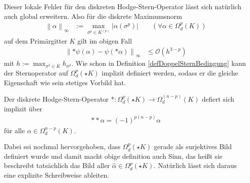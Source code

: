   Dieser lokale Fehler für den diskreten Hodge-Stern-Operator lässt sich natürlich auch global erweitern.
  Also für die diskrete Maximumsnorm
  \begin{align}
    \label{eqDiskreteMaximumsnorm}
    \left\| \alpha \right\|_{\infty} &:= \max_{\sigma^{p}\in K^{(p)}}\left| \alpha(\sigma^{p}) \right| \qquad (\forall\alpha\in\Omega^{p}_{d}(K))
  \end{align}
  auf dem Primärgitter \( K \) gilt im obigen Fall
  \begin{align}
    \left\| *\psi(\alpha) - \psi(*\alpha) \right\|_{\infty} &\le \mathcal{O}\left(h^{3-p}\right)
  \end{align}
  mit \( h:=\max_{\sigma^{2}\in K} h_{\sigma^{2}} \).
  Wie schon in Definition \ref{defDoppelSternBedingung} kann der Sternoperator auf \( \Omega^{p}_{d}(\star K) \) implizit definiert werden,
  sodass er die gleiche Eigenschaft wie sein stetiges Vorbild hat.

  \begin{definition}
    \label{defDualHodgeStern}
    Der diskrete Hodge-Stern-Operator \(*:\Omega^{p}_{d}(\star K) \rightarrow \Omega^{(n-p)}_{d}(K)\) defiert sich implizit über
    \begin{align}
      **\alpha = (-1)^{p(n-p)}\alpha
    \end{align}
    für alle \( \alpha\in\Omega^{n-p}_{d}(K) \).
  \end{definition}

  Dabei sei nochmal hervorgehoben, dass \(\Omega^{p}_{d}(\star K)  \) gerade als surjektives Bild definiert wurde und damit macht obige definition auch Sinn,
  das heißt sie beschreibt tatsächlich das Bild aller \( \hat\alpha\in\Omega^{p}_{d}(\star K) \).
  Natürlich lässt sich daraus eine explizite Schreibweise ableiten.
  
